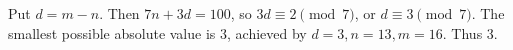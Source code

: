 Put $d=m-n$. Then $7n+3d=100$, so $3d\equiv2\pmod7$, or $d\equiv3\pmod7$. The smallest possible absolute value is $3$, achieved by $d=3,n=13,m=16$. Thus $\boxed3$.
